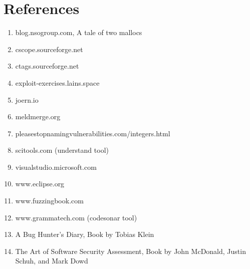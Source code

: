 \documentclass[12pt]{Training}
\begin{document}
\section*{References}
\begin{enumerate}
	\item blog.nsogroup.com, A tale of two mallocs
	\item cscope.sourceforge.net
	\item ctags.sourceforge.net
    \item exploit-exercises.lains.space
	\item joern.io
	\item meldmerge.org
	\item pleasestopnamingvulnerabilities.com/integers.html
	\item scitools.com (understand tool)
	\item visualstudio.microsoft.com
	\item www.eclipse.org
	\item www.fuzzingbook.com
	\item www.grammatech.com (codesonar tool)
	\item A Bug Hunter's Diary, Book by Tobias Klein
	\item The Art of Software Security Assessment, Book by John McDonald, Justin Schuh, and Mark Dowd
\end{enumerate}
\end{document}
